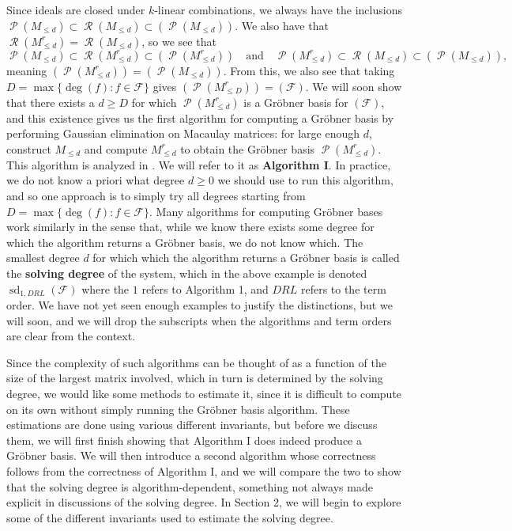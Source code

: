 \documentclass[11pt]{article}
\newcommand{\F}{\mathcal{F}}
\DeclareMathOperator{\Poly}{\mathscr{P}}
\DeclareMathOperator{\Row}{\mathscr{R}}
\DeclareMathOperator{\sd}{sd}
\theoremstyle{definition}
\begin{document}
Since ideals are closed under $k$-linear combinations, we always have the inclusions $\Poly(M_{\leq d}) \subset \Row(M_{\leq d}) \subset (\Poly(M_{\leq d}))$. We also have that $\Row(M_{\leq d}^r) = \Row(M_{\leq d})$, so we see that \[ \Poly(M_{\leq d}) \subset \Row(M_{\leq d}^r) \subset (\Poly(M_{\leq d}^r)) \quad \text{and} \quad \Poly(M_{\leq d}^r) \subset \Row(M_{\leq d}) \subset (\Poly(M_{\leq d})), \] meaning $(\Poly(M_{\leq d}^r)) = (\Poly(M_{\leq d}))$. From this, we also see that taking $D = \max\{\deg(f): f \in \F\}$ gives $(\Poly(M_{\leq D}^r)) = (\F)$. We will soon show that there exists a $d \geq D$ for which $\Poly(M_{\leq d}^r)$ is a Gröbner basis for $(\F)$, and this existence gives us the first algorithm for computing a Gröbner basis by performing Gaussian elimination on Macaulay matrices: for large enough $d$, construct $M_{\leq d}$ and compute $M_{\leq d}^r$ to obtain the Gröbner basis $\Poly(M_{\leq d}^r)$. This algorithm is analyzed in \cite{caminata2020solving}. We will refer to it as \textbf{Algorithm I}. In practice, we do not know a priori what degree $d \geq 0$ we should use to run this algorithm, and so one approach is to simply try all degrees starting from $D = \max\{\deg(f): f \in \F\}$. Many algorithms for computing Gröbner bases work similarly in the sense that, while we know there exists some degree for which the algorithm returns a Gröbner basis, we do not know which. The smallest degree $d$ for which which the algorithm returns a Gröbner basis is called the \textbf{solving degree} of the system, which in the above example is denoted $\sd_{1,DRL}(\F)$ where the $1$ refers to Algorithm 1, and $DRL$ refers to the term order. We have not yet seen enough examples to justify the distinctions, but we will soon, and we will drop the subscripts when the algorithms and term orders are clear from the context. 

Since the complexity of such algorithms can be thought of as a function of the size of the largest matrix involved, which in turn is determined by the solving degree, we would like some methods to estimate it, since it is difficult to compute on its own without simply running the Gröbner basis algorithm. These estimations are done using various different invariants, but before we discuss them, we will first finish showing that Algorithm I does indeed produce a Gröbner basis. We will then introduce a second algorithm whose correctness follows from the correctness of Algorithm I, and we will compare the two to show that the solving degree is algorithm-dependent, something not always made explicit in discussions of the solving degree. In Section 2, we will begin to explore some of the different invariants used to estimate the solving degree. 
\end{document}
